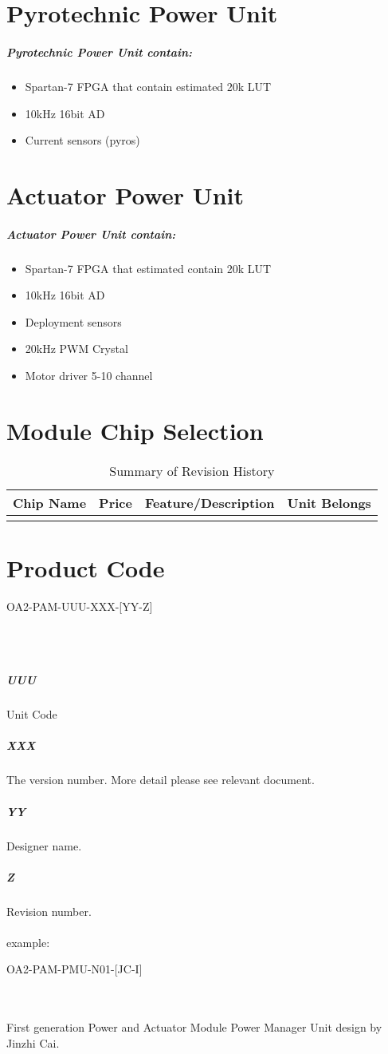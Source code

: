 \documentclass[12pt,article]{memoir}
\begin{document}
\section{Pyrotechnic Power Unit}
\subparagraph{Pyrotechnic Power Unit contain:}
\begin{itemize}
	\item Spartan-7 FPGA that contain estimated 20k LUT
	\item 10kHz 16bit AD
	\item Current sensors  (pyros)
\end{itemize}
\section{Actuator Power Unit}
\subparagraph{Actuator Power Unit contain:}
\begin{itemize}
	\item Spartan-7 FPGA that estimated contain 20k LUT
	\item 10kHz 16bit AD
	\item Deployment sensors 
	\item 20kHz PWM Crystal
	\item Motor driver 5-10 channel
\end{itemize}
\section{Module Chip Selection}
\begin{table}[H]
	\centering
	\begin{tabu}{ c | c | c | c }
		Chip Name & Price & Feature/Description & Unit Belongs\\ \hline
		 & & & \\
	\end{tabu}
	\caption{Summary of Revision History}
	\label{tab:slc}
\end{table}
\section{Product Code}
\begin{LARGE}
OA2-PAM-UUU-XXX-[YY-Z]
\end{LARGE}\\\\
\subparagraph{UUU}
Unit Code
\subparagraph{XXX}
The version number. More detail please see relevant document.
\subparagraph{YY}
Designer name.
\subparagraph{Z}
Revision number.\\\\
example: 
\begin{large}
OA2-PAM-PMU-N01-[JC-I]
\end{large}\\\\
First generation Power and Actuator Module Power Manager Unit design by Jinzhi Cai.
\newpage

\end{document}
